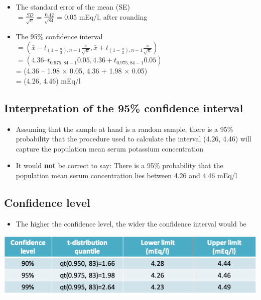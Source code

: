 \documentclass[
]{book}
\providecommand{\tightlist}{%
  \setlength{\itemsep}{0pt}\setlength{\parskip}{0pt}}
\begin{document}
\begin{itemize}
\tightlist
\item
  The standard error of the mean (SE)\\
  \(=\frac{SD}{\sqrt n}=\frac{0.42}{\sqrt {84}}=0.05\) mEq/l, after rounding
\item
  The 95\% confidence interval\\
  \(=\left(\bar x-t_{(1-\frac{\alpha}{2}),n-1}\frac{s}{\sqrt n},\bar x+t_{(1-\frac{\alpha}{2}),n-1}\frac{s}{\sqrt n}\right)\)\\
  \(=(4.36 – t_{0.975,84-1} 0.05, 4.36 + t_{0.975,84-1} 0.05)\)\\
  = (4.36 -- 1.98 × 0.05, 4.36 + 1.98 × 0.05)\\
  = (4.26, 4.46) mEq/l
\end{itemize}

\hypertarget{interpretation-of-the-95-confidence-interval}{%
\subsection{Interpretation of the 95\% confidence interval}\label{interpretation-of-the-95-confidence-interval}}

\begin{itemize}
\tightlist
\item
  Assuming that the sample at hand is a random sample, there is a 95\% probability that the procedure used to calculate the interval (4.26, 4.46) will capture the population mean serum potassium concentration
\item
  It would \textbf{not} be correct to say: There is a 95\% probability that the population mean serum concentration lies between 4.26 and 4.46 mEq/l
\end{itemize}

\hypertarget{confidence-level}{%
\subsection{Confidence level}\label{confidence-level}}

\begin{itemize}
\tightlist
\item
  The higher the confidence level, the wider the confidence interval would be
\end{itemize}

\includegraphics[width=1\linewidth]{./3_48}
\end{document}
